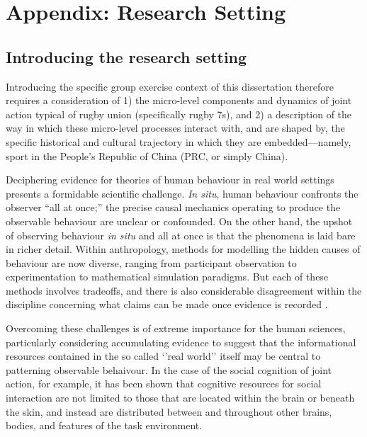 \chapter{\label{app2:theory}Appendix: Research Setting}

\begin{CJK}{UTF8}{gbsn}





  \section{Introducing the research setting}

Introducing the specific group exercise context of this dissertation therefore requires a consideration of 1) the micro-level components and dynamics of joint action typical of rugby union (specifically rugby 7s), and 2) a description of the way in which these micro-level processes interact with, and are shaped by, the specific historical and cultural trajectory in which they are embedded---namely, sport in the People's Republic of China (PRC, or simply China).


  Deciphering evidence for theories of human behaviour in real world settings presents a formidable scientific challenge.  \textit{In situ}, human behaviour confronts the observer ``all at once;'' the precise causal mechanics operating to produce the observable behaviour are unclear or confounded.  On the other hand, the upshot of observing behaviour \textit{in situ} and all at once is that the phenomena is laid bare in richer detail.  Within anthropology, methods for modelling the hidden causes of behaviour are now diverse, ranging from participant observation to experimentation to mathematical simulation paradigms.   But each of these methods involves tradeoffs, and there is also considerable disagreement within the discipline concerning what claims can be made once evidence is recorded \citep{Whitehouse2012}.

  Overcoming these challenges is of extreme importance for the human sciences, particularly considering accumulating evidence to suggest that the informational resources contained in the so called ‘’real world’’ itself may be central to patterning observable behaivour.  In the case of the social cognition of joint action, for example, it has been shown that cognitive resources for social interaction are not limited to those that are located within the brain or beneath the skin, and instead are distributed between and throughout other brains, bodies, and features of the task environment.


\end{CJK}
